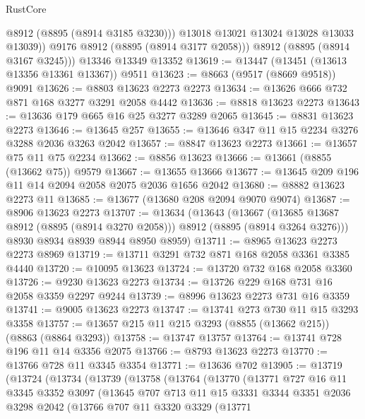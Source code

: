 \begin{lexlean}{RustCore}
\begin{coremodule}
              @8912
              (@8895 (@8914 @3185 @3230)))
            @13018
            @13021
            @13024
            @13028
            @13033
            @13039))
        @9176
        @8912
        (@8895 (@8914 @3177 @2058)))
      @8912
      (@8895 (@8914 @3167 @3245)))
    @13346
    @13349
    @13352
@13619 := @13447 (@13451 (@13613 @13356 @13361 @13367)) @9511
@13623 := @8663 (@9517 (@8669 @9518)) @9091
@13626 := @8803 @13623 @2273 @2273
@13634 := @13626 @666 @732 @871 @168 @3277 @3291 @2058 @4442
@13636 := @8818 @13623 @2273
@13643 := @13636 @179 @665 @16 @25 @3277 @3289 @2065
@13645 := @8831 @13623 @2273
@13646 := @13645 @257
@13655 := @13646 @347 @11 @15 @2234 @3276 @3288 @2036 @3263 @2042
@13657 := @8847 @13623 @2273
@13661 := @13657 @75 @11 @75 @2234
@13662 := @8856 @13623
@13666 := @13661 (@8855 (@13662 @75)) @9579
@13667 := @13655 @13666
@13677 := @13645 @209 @196 @11 @14 @2094 @2058 @2075 @2036 @1656 @2042
@13680 := @8882 @13623 @2273 @11
@13685 := @13677 (@13680 @208 @2094 @9070 @9074)
@13687 := @8906 @13623 @2273
@13707 := @13634
    (@13643
      (@13667 (@13685 @13687 @8912 (@8895 (@8914 @3270 @2058))) @8912 (@8895 (@8914 @3264 @3276)))
      @8930
      @8934
      @8939
      @8944
      @8950
      @8959)
@13711 := @8965 @13623 @2273 @2273 @8969
@13719 := @13711 @3291 @732 @871 @168 @2058 @3361 @3385 @4440
@13720 := @10095 @13623
@13724 := @13720 @732 @168 @2058 @3360
@13726 := @9230 @13623 @2273
@13734 := @13726 @229 @168 @731 @16 @2058 @3359 @2297 @9244
@13739 := @8996 @13623 @2273 @731 @16 @3359
@13741 := @9005 @13623 @2273
@13747 := @13741 @273 @730 @11 @15 @3293 @3358
@13757 := @13657 @215 @11 @215 @3293 (@8855 (@13662 @215)) (@8863 (@8864 @3293))
@13758 := @13747 @13757
@13764 := @13741 @728 @196 @11 @14 @3356 @2075
@13766 := @8793 @13623 @2273
@13770 := @13766 @728 @11 @3345 @3354
@13771 := @13636 @702
@13905 := @13719
    (@13724
      (@13734
        (@13739
          (@13758
            (@13764
              (@13770
                (@13771
                  @727
                  @16
                  @11
                  @3345
                  @3352
                  @3097
                  (@13645
                    @707
                    @713
                    @11
                    @15
                    @3331
                    @3344
                    @3351
                    @2036
                    @3298
                    @2042
                    (@13766
                      @707
                      @11
                      @3320
                      @3329
                      (@13771

\end{coremodule}
\end{lexlean}
